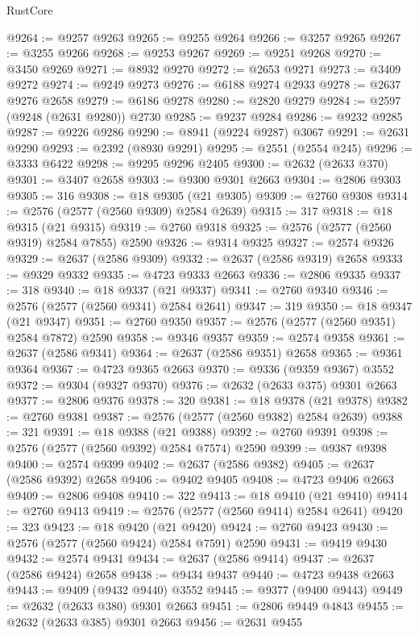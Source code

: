 \begin{lexlean}{RustCore}
\begin{coremodule}
@9264 := @9257 @9263
@9265 := @9255 @9264
@9266 := @3257 @9265
@9267 := @3255 @9266
@9268 := @9253 @9267
@9269 := @9251 @9268
@9270 := @3450 @9269
@9271 := @8932 @9270
@9272 := @2653 @9271
@9273 := @3409 @9272
@9274 := @9249 @9273
@9276 := @6188 @9274 @2933
@9278 := @2637 @9276 @2658
@9279 := @6186 @9278
@9280 := @2820 @9279
@9284 := @2597 (@9248 (@2631 @9280)) @2730
@9285 := @9237 @9284
@9286 := @9232 @9285
@9287 := @9226 @9286
@9290 := @8941 (@9224 @9287) @3067
@9291 := @2631 @9290
@9293 := @2392 (@8930 @9291)
@9295 := @2551 (@2554 @245)
@9296 := @3333 @6422
@9298 := @9295 @9296 @2405
@9300 := @2632 (@2633 @370)
@9301 := @3407 @2658
@9303 := @9300 @9301 @2663
@9304 := @2806 @9303
@9305 := 316
@9308 := @18 @9305 (@21 @9305)
@9309 := @2760 @9308
@9314 := @2576 (@2577 (@2560 @9309) @2584 @2639)
@9315 := 317
@9318 := @18 @9315 (@21 @9315)
@9319 := @2760 @9318
@9325 := @2576 (@2577 (@2560 @9319) @2584 @7855) @2590
@9326 := @9314 @9325
@9327 := @2574 @9326
@9329 := @2637 (@2586 @9309)
@9332 := @2637 (@2586 @9319) @2658
@9333 := @9329 @9332
@9335 := @4723 @9333 @2663
@9336 := @2806 @9335
@9337 := 318
@9340 := @18 @9337 (@21 @9337)
@9341 := @2760 @9340
@9346 := @2576 (@2577 (@2560 @9341) @2584 @2641)
@9347 := 319
@9350 := @18 @9347 (@21 @9347)
@9351 := @2760 @9350
@9357 := @2576 (@2577 (@2560 @9351) @2584 @7872) @2590
@9358 := @9346 @9357
@9359 := @2574 @9358
@9361 := @2637 (@2586 @9341)
@9364 := @2637 (@2586 @9351) @2658
@9365 := @9361 @9364
@9367 := @4723 @9365 @2663
@9370 := @9336 (@9359 @9367) @3552
@9372 := @9304 (@9327 @9370)
@9376 := @2632 (@2633 @375) @9301 @2663
@9377 := @2806 @9376
@9378 := 320
@9381 := @18 @9378 (@21 @9378)
@9382 := @2760 @9381
@9387 := @2576 (@2577 (@2560 @9382) @2584 @2639)
@9388 := 321
@9391 := @18 @9388 (@21 @9388)
@9392 := @2760 @9391
@9398 := @2576 (@2577 (@2560 @9392) @2584 @7574) @2590
@9399 := @9387 @9398
@9400 := @2574 @9399
@9402 := @2637 (@2586 @9382)
@9405 := @2637 (@2586 @9392) @2658
@9406 := @9402 @9405
@9408 := @4723 @9406 @2663
@9409 := @2806 @9408
@9410 := 322
@9413 := @18 @9410 (@21 @9410)
@9414 := @2760 @9413
@9419 := @2576 (@2577 (@2560 @9414) @2584 @2641)
@9420 := 323
@9423 := @18 @9420 (@21 @9420)
@9424 := @2760 @9423
@9430 := @2576 (@2577 (@2560 @9424) @2584 @7591) @2590
@9431 := @9419 @9430
@9432 := @2574 @9431
@9434 := @2637 (@2586 @9414)
@9437 := @2637 (@2586 @9424) @2658
@9438 := @9434 @9437
@9440 := @4723 @9438 @2663
@9443 := @9409 (@9432 @9440) @3552
@9445 := @9377 (@9400 @9443)
@9449 := @2632 (@2633 @380) @9301 @2663
@9451 := @2806 @9449 @4843
@9455 := @2632 (@2633 @385) @9301 @2663
@9456 := @2631 @9455

\end{coremodule}
\end{lexlean}

